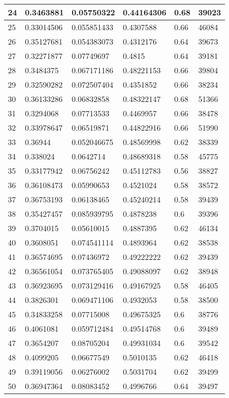 \begin{longtable}{|l|l|l|l|l|l|}
24 & 0.3463881 & 0.05750322 & 0.44164306 & 0.68 & 39023 \\ \hline 
25 & 0.33014506 & 0.055851433 & 0.4307588 & 0.66 & 46084 \\ \hline 
26 & 0.35127681 & 0.054383073 & 0.4312176 & 0.64 & 39673 \\ \hline 
27 & 0.32271877 & 0.07749697 & 0.4815 & 0.64 & 39181 \\ \hline 
28 & 0.3484375 & 0.067171186 & 0.48221153 & 0.66 & 39804 \\ \hline 
29 & 0.32590282 & 0.072507404 & 0.4351852 & 0.66 & 38234 \\ \hline 
30 & 0.36133286 & 0.06832858 & 0.48322147 & 0.68 & 51366 \\ \hline 
31 & 0.3294068 & 0.07713533 & 0.4469957 & 0.66 & 38478 \\ \hline 
32 & 0.33978647 & 0.06519871 & 0.44822916 & 0.66 & 51990 \\ \hline 
33 & 0.36944 & 0.052046675 & 0.48569998 & 0.62 & 38339 \\ \hline 
34 & 0.338024 & 0.0642714 & 0.48689318 & 0.58 & 45775 \\ \hline 
35 & 0.33177942 & 0.06756242 & 0.45112783 & 0.56 & 38827 \\ \hline 
36 & 0.36108473 & 0.05990653 & 0.4521024 & 0.58 & 38572 \\ \hline 
37 & 0.36753193 & 0.06138465 & 0.45240214 & 0.58 & 39439 \\ \hline 
38 & 0.35427457 & 0.085939795 & 0.4878238 & 0.6 & 39396 \\ \hline 
39 & 0.3704015 & 0.05610015 & 0.4887395 & 0.62 & 46134 \\ \hline 
40 & 0.3608051 & 0.074541114 & 0.4893964 & 0.62 & 38538 \\ \hline 
41 & 0.36574695 & 0.07436972 & 0.49222222 & 0.62 & 39439 \\ \hline 
42 & 0.36561054 & 0.073765405 & 0.49088097 & 0.62 & 38948 \\ \hline 
43 & 0.36923695 & 0.073129416 & 0.49167925 & 0.58 & 46405 \\ \hline 
44 & 0.3826301 & 0.069471106 & 0.4932053 & 0.58 & 38500 \\ \hline 
45 & 0.34833258 & 0.07715008 & 0.49675325 & 0.6 & 38776 \\ \hline 
46 & 0.4061081 & 0.059712484 & 0.49514768 & 0.6 & 39489 \\ \hline 
47 & 0.3654207 & 0.08705204 & 0.49931034 & 0.6 & 39542 \\ \hline 
48 & 0.4099205 & 0.06677549 & 0.5010135 & 0.62 & 46418 \\ \hline 
49 & 0.39119056 & 0.06276002 & 0.5031704 & 0.62 & 39499 \\ \hline 
50 & 0.36947364 & 0.08083452 & 0.4996766 & 0.64 & 39497 \\ \hline 
\end{longtable}